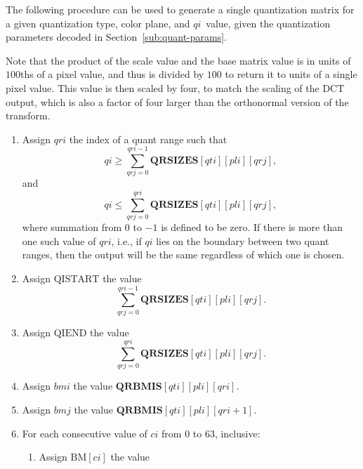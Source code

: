 \documentclass[9pt,letterpaper]{book}
\newcommand{\idx}[1]{{\ensuremath{\mathit{#1}}}}
\newcommand{\qti}{\idx{qti}}
\newcommand{\pli}{\idx{pli}}
\newcommand{\qi}{\idx{qi}}
\newcommand{\ci}{\idx{ci}}
\newcommand{\bmi}{\idx{bmi}}
\newcommand{\bmj}{\idx{bmj}}
\newcommand{\qri}{\idx{qri}}
\newcommand{\qrj}{\idx{qrj}}
\newcommand{\bitvar}[1]{\ensuremath{\mathbf{\bm{#1}}}}
\newcommand{\locvar}[1]{\ensuremath{\mathrm{#1}}}
\numberwithin{equation}{chapter}
\numberwithin{figure}{chapter}
\numberwithin{table}{chapter}
\begin{document}
The following procedure can be used to generate a single quantization matrix
 for a given quantization type, color plane, and \qi\ value, given the
 quantization parameters decoded in Section~\ref{sub:quant-params}.

Note that the product of the scale value and the base matrix value is in units
 of $100$ths of a pixel value, and thus is divided by $100$ to return it to
 units of a single pixel value.
This value is then scaled by four, to match the scaling of the DCT output,
 which is also a factor of four larger than the orthonormal version of the
 transform.

\begin{enumerate}
\item
Assign \locvar{\qri} the index of a quant range such that
\begin{displaymath}
\bitvar{\qi} \ge \sum_{\qrj=0}^{\locvar{\qri}-1}
 \bitvar{QRSIZES}[\bitvar{\qti}][\bitvar{\pli}][\qrj],
\end{displaymath}
 and
\begin{displaymath}
\bitvar{\qi} \le \sum_{\qrj=0}^{\locvar{\qri}}
 \bitvar{QRSIZES}[\bitvar{\qti}][\bitvar{\pli}][\qrj],
\end{displaymath}
 where summation from $0$ to $-1$ is defined to be zero.
If there is more than one such value of $\locvar{\qri}$, i.e., if \bitvar{\qi}
 lies on the boundary between two quant ranges, then the output will be the
 same regardless of which one is chosen.
\item
Assign \locvar{QISTART} the value
\begin{displaymath}
\sum_{\qrj=0}^{\qri-1} \bitvar{QRSIZES}[\bitvar{\qti}][\bitvar{\pli}][\qrj].
\end{displaymath}
\item
Assign \locvar{QIEND} the value
\begin{displaymath}
\sum_{\qrj=0}^{\qri} \bitvar{QRSIZES}[\bitvar{\qti}][\bitvar{\pli}][\qrj].
\end{displaymath}
\item
Assign \locvar{\bmi} the value
 $\bitvar{QRBMIS}[\bitvar{\qti}][\bitvar{\pli}][\qri]$.
\item
Assign \locvar{\bmj} the value
 $\bitvar{QRBMIS}[\bitvar{\qti}][\bitvar{\pli}][\qri+1]$.
\item
For each consecutive value of \locvar{\ci} from $0$ to $63$, inclusive:
\begin{enumerate}
\item
Assign $\locvar{BM}[\locvar{\ci}]$ the value
\begin{displaymath}

\end{displaymath}
\end{enumerate}
\end{enumerate}
\end{document}
